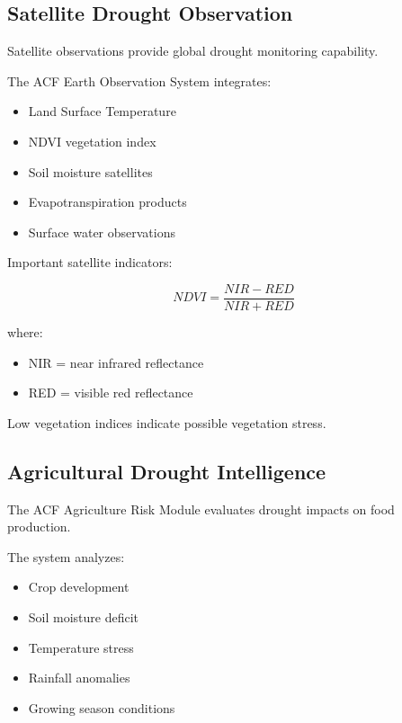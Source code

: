 
\subsection{Satellite Drought Observation}

Satellite observations provide global drought monitoring capability.

The ACF Earth Observation System integrates:

\begin{itemize}

\item Land Surface Temperature

\item NDVI vegetation index

\item Soil moisture satellites

\item Evapotranspiration products

\item Surface water observations

\end{itemize}


Important satellite indicators:

\[
NDVI=
\frac{NIR-RED}
{NIR+RED}
\]


where:

\begin{itemize}

\item NIR = near infrared reflectance

\item RED = visible red reflectance

\end{itemize}


Low vegetation indices indicate possible vegetation stress.


\subsection{Agricultural Drought Intelligence}

The ACF Agriculture Risk Module evaluates drought impacts on food
production.

The system analyzes:

\begin{itemize}

\item Crop development

\item Soil moisture deficit

\item Temperature stress

\item Rainfall anomalies

\item Growing season conditions

\end{itemize}


